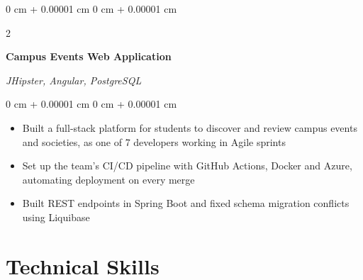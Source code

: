 \documentclass[10pt, a4paper]{article}
\newenvironment{highlights}{
    \begin{itemize}[
        topsep=0.10 cm,
        parsep=0.10 cm,
        partopsep=0pt,
        itemsep=0pt,
        leftmargin=20pt
    ]
}{
    \end{itemize}
} %
\newenvironment{onecolentry}{
    \begin{adjustwidth}{
        0 cm + 0.00001 cm
    }{
        0 cm + 0.00001 cm
    }
}{
    \end{adjustwidth}
} %
\newenvironment{twocolentry}[2][]{
    \onecolentry
    \def\secondColumn{#2}
    \setcolumnwidth{\fill, 4.5 cm}
    \begin{paracol}{2}
}{
    \switchcolumn \raggedleft \secondColumn
    \end{paracol}
    \endonecolentry
} %
\begin{document}
    \vspace{0.2 cm}

    \begin{twocolentry}{
        \textit{JHipster, Angular, PostgreSQL}
    }
        \textbf{Campus Events Web Application}
    \end{twocolentry}

    \vspace{0.10 cm}
    \begin{onecolentry}
        \begin{highlights}
            \item Built a full-stack platform for students to discover and review campus events and societies, as one of 7 developers working in Agile sprints
            \item Set up the team's CI/CD pipeline with GitHub Actions, Docker and Azure, automating deployment on every merge
            \item Built REST endpoints in Spring Boot and fixed schema migration conflicts using Liquibase
        \end{highlights}
    \end{onecolentry}


    \section{Technical Skills}
\end{document}
